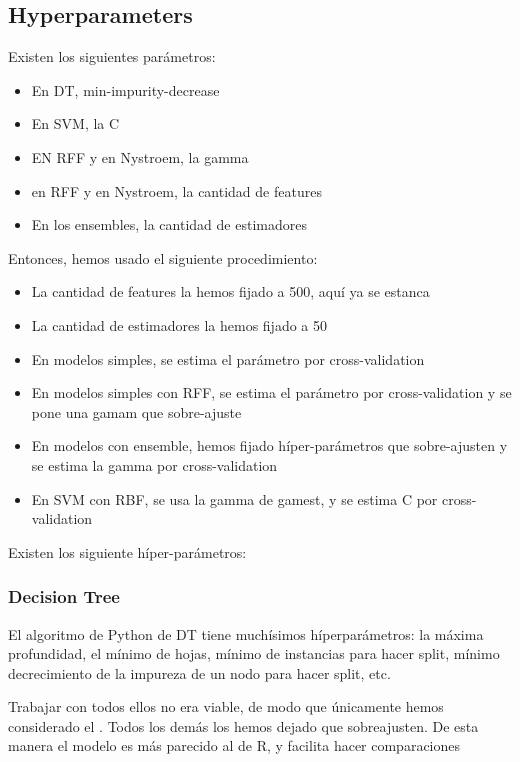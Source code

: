 \subsection{Hyperparameters}

\begin{note}
  Existen los siguientes parámetros:
  \begin{itemize}
    \item En DT, min-impurity-decrease
    \item En SVM, la C
    \item EN RFF y en Nystroem, la gamma
    \item en RFF y en Nystroem, la cantidad de features
    \item En los ensembles, la cantidad de estimadores
  \end{itemize}

  Entonces, hemos usado el siguiente procedimiento:
  \begin{itemize}
    \item La cantidad de features la hemos fijado a 500, aquí ya se estanca
    \item La cantidad de estimadores la hemos fijado a 50
    \item En modelos simples, se estima el parámetro por cross-validation
    \item En modelos simples con RFF, se estima el parámetro por cross-validation
    y se pone una gamam que sobre-ajuste
    \item En modelos con ensemble, hemos fijado híper-parámetros que
    sobre-ajusten y se estima la gamma por cross-validation
    \item En SVM con RBF, se usa la gamma de gamest, y se estima C por
    cross-validation
  \end{itemize}
\end{note}

Existen los siguiente híper-parámetros:
\subsubsection*{Decision Tree}
El algoritmo de Python de DT tiene muchísimos híperparámetros: la máxima
profundidad, el mínimo de hojas, mínimo de instancias para hacer split,
mínimo decrecimiento de la impureza de un nodo para hacer split, etc.

Trabajar con todos ellos no era viable, de modo que únicamente hemos considerado
el . Todos los demás los hemos dejado que
sobreajusten. De esta manera el modelo es más parecido al de R, y facilita hacer
comparaciones
